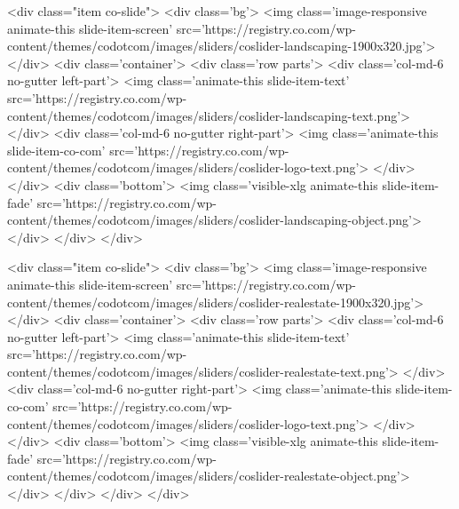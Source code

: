                 <div class="item co-slide">
                    <div class='bg'>
                        <img class='image-responsive animate-this slide-item-screen' src='https://registry.co.com/wp-content/themes/codotcom/images/sliders/coslider-landscaping-1900x320.jpg'>
                    </div>
                    <div class='container'>
                        <div class='row parts'>
                            <div class='col-md-6 no-gutter left-part'>
                                <img class='animate-this slide-item-text' src='https://registry.co.com/wp-content/themes/codotcom/images/sliders/coslider-landscaping-text.png'>
                            </div>
                            <div class='col-md-6 no-gutter right-part'>
                                <img class='animate-this slide-item-co-com' src='https://registry.co.com/wp-content/themes/codotcom/images/sliders/coslider-logo-text.png'>
                            </div>
                        </div>
                        <div class='bottom'>
                            <img class='visible-xlg animate-this slide-item-fade' src='https://registry.co.com/wp-content/themes/codotcom/images/sliders/coslider-landscaping-object.png'>
                        </div>
                    </div>
                </div>

                <div class="item co-slide">
                    <div class='bg'>
                        <img class='image-responsive animate-this slide-item-screen' src='https://registry.co.com/wp-content/themes/codotcom/images/sliders/coslider-realestate-1900x320.jpg'>
                    </div>
                    <div class='container'>
                        <div class='row parts'>
                            <div class='col-md-6 no-gutter left-part'>
                                <img class='animate-this slide-item-text' src='https://registry.co.com/wp-content/themes/codotcom/images/sliders/coslider-realestate-text.png'>
                            </div>
                            <div class='col-md-6 no-gutter right-part'>
                                <img class='animate-this slide-item-co-com' src='https://registry.co.com/wp-content/themes/codotcom/images/sliders/coslider-logo-text.png'>
                            </div>
                        </div>
                        <div class='bottom'>
                            <img class='visible-xlg animate-this slide-item-fade' src='https://registry.co.com/wp-content/themes/codotcom/images/sliders/coslider-realestate-object.png'>
                        </div>
                    </div>
                </div>
            </div>

